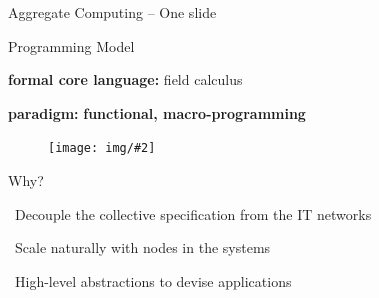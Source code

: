 \documentclass[presentation, 8pt,169]{beamer}\mode<presentation>{\usetheme{AMSBolognaFC}}
\newcommand{\lbl}[1]{\textbf{\textcolor{gray!90!white}{#1}}}
\newcommand{\bo}[1]{\textbf{#1}}
\newcommand{\imgv}[2]{
\begin{figure}
\centering
\texttt{[image: img/\#2]}
\end{figure}
}
\begin{document}
\begin{frame}{Aggregate Computing -- One slide}
{  }{
  \begin{block}{\footnotesize Programming Model}
    \scriptsize
    
    \lbl{formal core language:} field calculus\vspace{0.1cm}
    
    \lbl{paradigm:} \bo{functional, macro-programming} \vspace{0.1cm} %
    
    \centering
    \imgv{0.22}{channel.pdf}
  \end{block}  
    
  \begin{block}{\footnotesize Why?}
    \scriptsize
    
    {\bold{\faThumbsUp}} \, Decouple the collective specification from the IT networks  \vspace{0.1cm}
    
    {\bold{\faThumbsUp}} \, Scale naturally with nodes in the systems  \vspace{0.1cm}
     
    {\bold{\faThumbsUp}} \, High-level abstractions to devise applications
    
  \end{block}
  

  }
  
\end{frame}
\end{document}
